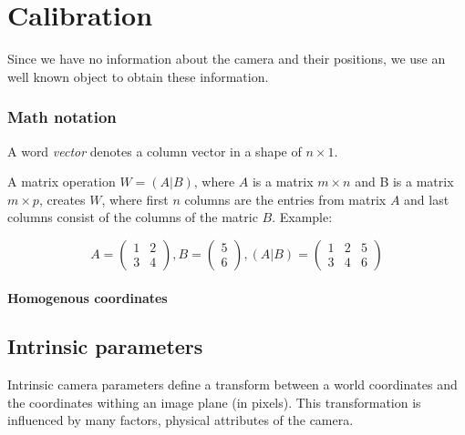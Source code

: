 \chapter{Calibration}


Since we have no information about the camera and their positions, we use an
well known object to obtain these information.

\subsection*{Math notation}

A word \emph{vector} denotes a column vector in a shape of $n\times1$.

A matrix operation $W = (A|B)$, where $A$ is a matrix $m \times n$ and B is a
matrix $m \times p$, creates $W$, where first $n$ columns are the entries from
matrix $A$ and last columns consist of the columns of the matric $B$.
Example:

\[
A = \begin{pmatrix}
	1 & 2 \\
	3 & 4
\end{pmatrix},
B = \begin{pmatrix}
5 \\
6
\end{pmatrix},
(A|B) = \begin{pmatrix}
	1 & 2 & 5 \\
	3 & 4 & 6
\end{pmatrix}
\]

\subsubsection*{Homogenous coordinates}



\section{Intrinsic parameters}

Intrinsic camera parameters define a transform between a world coordinates and
the coordinates withing an image plane (in pixels). This transformation is
influenced by many factors, physical attributes of the camera.

